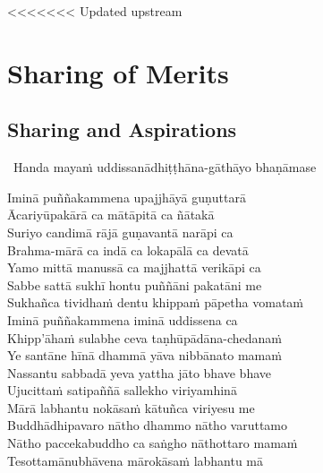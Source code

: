 <<<<<<< Updated upstream
\ifdesktopversion
{}
\else
{}
\fi

\chapter{Sharing of Merits}

\begingroup
\setsechook{%
  \clearpage%
  \setsecnumformat{}%
}

\setsecheadstyle{\sectionFmt}

\section{Sharing and Aspirations}
\label{uddissanadhitthana}

\begin{leader}
  \anglebracketleft\ \hspace{-0.5mm}Handa mayaṁ uddissanādhiṭṭhāna-gāthāyo bhaṇāmase \hspace{-0.5mm}\anglebracketright\
\end{leader}

Iminā puññakammena upajjhāyā guṇuttarā\\
Ācariyūpakārā ca mātāpitā ca ñātakā\\
Suriyo candimā rājā guṇavantā narāpi ca\\
Brahma-mārā ca indā ca lokapālā ca devatā\\
Yamo mittā manussā ca majjhattā verikāpi ca\\
Sabbe sattā sukhī hontu puññāni pakatāni me\\
Sukhañca tividhaṁ dentu khippaṁ pāpetha vomataṁ\\
Iminā puññakammena iminā uddissena ca\\
Khipp'āhaṁ sulabhe ceva taṇhūpādāna-chedanaṁ\\
Ye santāne hīnā dhammā yāva nibbānato mamaṁ\\
Nassantu sabbadā yeva yattha jāto bhave bhave\\
Ujucittaṁ satipaññā sallekho viriyamhinā\\
Mārā labhantu nokāsaṁ kātuñca viriyesu me\\
Buddhādhipavaro nātho dhammo nātho varuttamo\\
Nātho paccekabuddho ca saṅgho nāthottaro mamaṁ\\
Tesottamānubhāvena mārokāsaṁ labhantu mā

